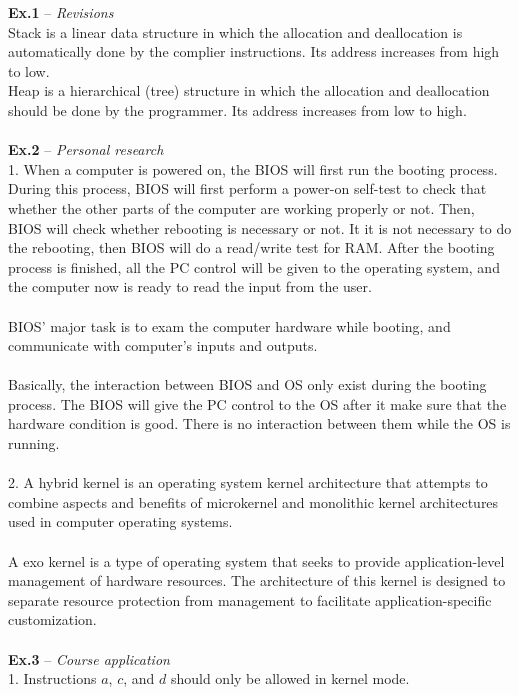 \documentclass{article}
\begin{document}
\newpage
\noindent\textbf{Ex.1} -- \textit{Revisions}\\
Stack is a linear data structure in which the allocation and deallocation is automatically done by the complier instructions. Its address increases from high to low. \\
Heap is a hierarchical (tree) structure in which the allocation and deallocation should be done by the programmer. Its address increases from low to high. \\ \\
\noindent\textbf{Ex.2} -- \textit{Personal research}\\
1. When a computer is powered on, the BIOS will first run the booting process. During this process, BIOS will first perform a power-on self-test to check that whether the other parts of the computer are working properly or not. Then, BIOS will check whether rebooting is necessary or not. It it is not necessary to do the rebooting, then BIOS will do a read/write test for RAM. After the booting process is finished, all the PC control will be given to the operating system, and the computer now is ready to read the input from the user.\\ \\
BIOS' major task is to exam the computer hardware while booting, and communicate with computer's inputs and outputs.\\ \\
Basically, the interaction between BIOS and OS only exist during the booting process. The BIOS will give the PC control to the OS after it make sure that the hardware condition is good. There is no interaction between them while the OS is running.\\ \\
2. A hybrid kernel is an operating system kernel architecture that attempts to combine aspects and benefits of microkernel and monolithic kernel architectures used in computer operating systems. \\ \\
A exo kernel is a type of operating system that seeks to provide application-level management of hardware resources. The architecture of this kernel is designed to separate resource protection from management to facilitate application-specific customization.\\ \\
\noindent\textbf{Ex.3} -- \textit{Course application}\\
1. Instructions $a$, $c$, and $d$ should only be allowed in kernel mode.\\
\end{document}
